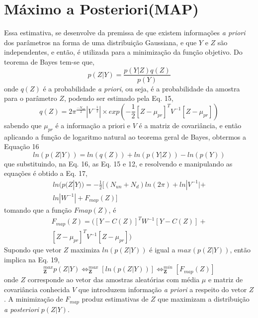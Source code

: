 \documentclass[por]{Template_SBEF}
\begin{document}
\section{Máximo a Posteriori(MAP)}
Essa estimativa, se desenvolve da premissa de que existem informações \textit{a priori} dos parâmetros na forma de uma distribuição Gaussiana, e que $Y$ e $Z$ são independentes, e então, é utilizada para a minimização da função objetivo. Do teorema de Bayes tem-se que,
\begin{equation}
p(Z|Y)= \frac{p(Y|Z)q(Z)}{p(Y)}
\end{equation}
onde $q(Z)$ é a probabilidade \textit{a priori}, ou seja, é a probabilidade da amostra para o parâmetro $Z$, podendo ser estimado pela Eq. 15,
\begin{equation}
q(Z)=2\pi^{\frac{-N_{un}}{2}}|V^{-\frac{1}{2}}| \times exp(-\frac{1}{2}[Z-\mu_{pr}]^T V^{-1}[Z-\mu_{pr}])
\end{equation} 
sabendo que $\mu_{pr}$ é a informação a priori e $V$ é a matriz de covariância, e então aplicando a função de logaritmo natural ao teorema geral de Bayes, obtermos a Equação 16
\begin{equation}
ln(p(Z|Y))=ln(q(Z))+ln(p(Y|Z))-ln(p(Y))
\end{equation}
que substituindo, na Eq. 16, as Eq. 15 e 12, e resolvendo e manipulando as equações é obtido a Eq. 17,
\begin{equation}
\begin{split}
ln(p(Z|Y)) = -\frac{1}{2}[(N_{un}+N_d)ln(2\pi)+ln|V^{-1}|+\\
ln|W^{-1}|+F_{map}(Z)]
\end{split}
\end{equation} 
tomando que a função $F{map}(Z)$, é
\vspace{10pt}
\begin{equation}
\begin{split}
F_{map}(Z)=([Y-C(Z)]^TW^{-1}[Y-C(Z)]+\\
[Z- \mu_{pr}]^T V^{-1}[Z-\mu_{pr}])
\end{split}
\end{equation}
Supondo que vetor $Z$ maximiza $ln(p(Z|Y))$ é igual a $max(p(Z|Y))$, então implica na Eq. 19,
\begin{equation}
_\mathbf{Z}^{max} p(Z|Y) \Leftrightarrow _\mathbf{Z}^{max} [ln(p(Z|Y))] \Leftrightarrow _\mathbf{Z}^{min} [F_{map}(Z)]
\end{equation}
onde $Z$ corresponde ao vetor das amostras aleatórias com média $\mu$ e matriz de covariância conhecida $V$ que introduzem informação \textit{a priori} a respeito do vetor $Z$. A minimização de $F_{map}$ produz estimativas de $Z$ que maximizam a distribuição \textit{a posteriori} $p(Z|Y)$.
\end{document}

